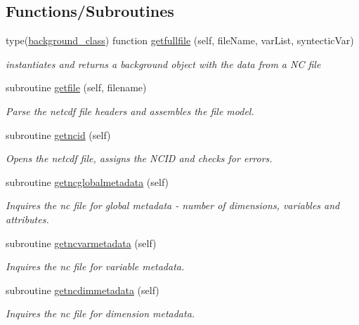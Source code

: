 \subsection*{Functions/\+Subroutines}
\begin{DoxyCompactItemize}
\item 
type(\mbox{\hyperlink{structbackground__mod_1_1background__class}{background\+\_\+class}}) function \mbox{\hyperlink{namespacenetcdfparser__mod_ada78b9f33d39c4763f412f004524cbea}{getfullfile}} (self, file\+Name, var\+List, syntectic\+Var)
\begin{DoxyCompactList}\small\item\em instantiates and returns a background object with the data from a NC file \end{DoxyCompactList}\item 
subroutine \mbox{\hyperlink{namespacenetcdfparser__mod_a57c39a4003778a6bf90cfd36b69380bc}{getfile}} (self, filename)
\begin{DoxyCompactList}\small\item\em Parse the netcdf file headers and assembles the file model. \end{DoxyCompactList}\item 
subroutine \mbox{\hyperlink{namespacenetcdfparser__mod_a741dd5b5985255e73aa9d3cf08755e91}{getncid}} (self)
\begin{DoxyCompactList}\small\item\em Opens the netcdf file, assigns the N\+C\+ID and checks for errors. \end{DoxyCompactList}\item 
subroutine \mbox{\hyperlink{namespacenetcdfparser__mod_a409f59662d71fb63e5fb5e057fdfd6ee}{getncglobalmetadata}} (self)
\begin{DoxyCompactList}\small\item\em Inquires the nc file for global metadata -\/ number of dimensions, variables and attributes. \end{DoxyCompactList}\item 
subroutine \mbox{\hyperlink{namespacenetcdfparser__mod_a46989199271acb6205cc61ac413d5a56}{getncvarmetadata}} (self)
\begin{DoxyCompactList}\small\item\em Inquires the nc file for variable metadata. \end{DoxyCompactList}\item 
subroutine \mbox{\hyperlink{namespacenetcdfparser__mod_a6354ee8b3c773cc7a5ad247ad1e34eeb}{getncdimmetadata}} (self)
\begin{DoxyCompactList}\small\item\em Inquires the nc file for dimension metadata. \end{DoxyCompactList}\item 

\end{DoxyCompactItemize}
